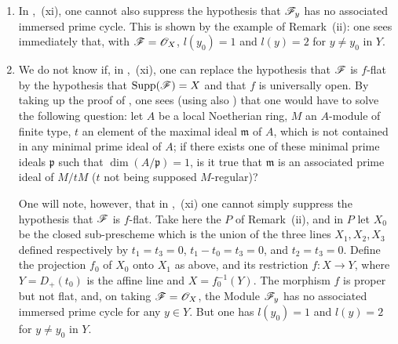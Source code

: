 \begin{remarks}[12.2.3]
\begin{enumerate}[label=(\roman*)]
  \item In ,~(xi), one cannot also suppress the hypothesis that $\mathscr{F}_y$ has no associated immersed prime cycle.
This is shown by the example of Remark~(ii): one sees immediately that, with $\mathscr{F}=\mathscr{O}_X$, $l(y_0)=1$ and $l(y)=2$ for $y\neq y_0$ in $Y$.

  \item We do not know if, in ,~(xi), one can replace the hypothesis that $\mathscr{F}$ is $f$-flat by the hypothesis that $\operatorname{Supp}(\mathscr{F})=X$ and that $f$ is universally open.
By taking up the proof of , one sees (using also ) that one would have to solve the following question: let $A$ be a local Noetherian ring, $M$ an $A$-module of finite type,
$t$ an element of the maximal ideal $\mathfrak{m}$ of $A$, which is not contained in any minimal prime ideal of $A$; if there exists one of these minimal prime ideals $\mathfrak{p}$ such that $\dim(A/\mathfrak{p})=1$, is it true that $\mathfrak{m}$ is an associated prime ideal of $M/tM$ ($t$ not being supposed $M$-regular)?

One will note, however, that in ,~(xi) one cannot simply suppress the hypothesis that $\mathscr{F}$ is $f$-flat. Take here the $P$ of Remark~(ii), and in $P$ let $X_0$ be the closed sub-prescheme which is the union of the three lines $X_1,X_2,X_3$ defined respectively by $t_1=t_3=0$, $t_1-t_0=t_3=0$, and $t_2=t_3=0$. Define the projection $f_0$ of $X_0$ onto $X_1$ as above, and its restriction $f:X\to Y$, where $Y=D_+(t_0)$ is the affine line and $X=f_0^{-1}(Y)$. The morphism $f$ is proper but not flat, and, on taking $\mathscr{F}=\mathscr{O}_X$, the Module $\mathscr{F}_y$ has no associated immersed prime cycle for any $y\in Y$. But one has $l(y_0)=1$ and $l(y)=2$ for $y\neq y_0$ in $Y$.
\end{enumerate}
\end{remarks}

